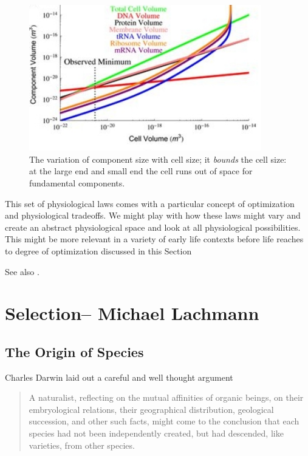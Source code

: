 \documentclass[]{article}
\begin{document}
\begin{figure}[H]
	\caption[The variation of component size with cell size]{The variation of component size with cell size; it \textit{bounds} the cell size: at the large end and small end the cell runs out of space for fundamental components.\cite{kempes2016evolutionary}}\label{fig:BacterialPhysiology}
	\includegraphics[width=0.9\textwidth]{BacterialPhysiology}
\end{figure}

This set of physiological laws comes with a particular concept of optimization and physiological tradeoffs. We might play with how these laws might vary and create an abstract physiological space and look at all physiological possibilities. This might be more relevant in a variety of early life contexts before life reaches to degree of optimization discussed in this Section


See also \cite{kempes2011predicting}.

\section{Selection-- Michael Lachmann}

\subsection{The Origin of Species}
Charles Darwin laid out a careful and well thought argument\cite{darwin1859origin}
\begin{quote}
	A naturalist, reflecting on the mutual affinities of organic beings, on their embryological relations, their geographical distribution, geological succession, and other such facts, might come to the conclusion that each species had not been independently created, but had descended, like varieties, from other  species.
\end{quote}
\end{document}
